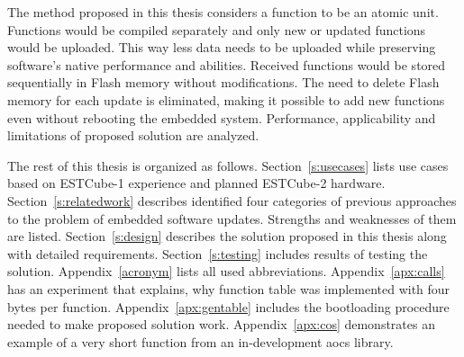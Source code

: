 The method proposed in this thesis considers a function to be an atomic unit. Functions would be compiled separately and only new or updated functions would be uploaded.  This way less data needs to be uploaded while preserving software's native performance and abilities. Received functions would be stored sequentially in Flash memory without modifications. The need to delete Flash memory for each update is eliminated, making it possible to add new functions even without rebooting the embedded system. Performance, applicability and limitations of proposed solution are analyzed.

The rest of this thesis is organized as follows. Section~\ref{s:usecases} lists use cases based on ESTCube-1 experience and planned ESTCube-2 hardware. Section~\ref{s:relatedwork} describes identified four categories of previous approaches to the problem of embedded software updates. Strengths and weaknesses of them are listed. Section~\ref{s:design} describes the solution proposed in this thesis along with detailed requirements. Section~\ref{s:testing} includes results of testing the solution. Appendix~\ref{acronym} lists all used abbreviations. Appendix~\ref{apx:calls} has an experiment that explains, why function table was implemented with four bytes per function. Appendix~\ref{apx:gentable} includes the bootloading procedure needed to make proposed solution work. Appendix~\ref{apx:cos} demonstrates an example of a very short function from an in-development \gls{aocs} library.
